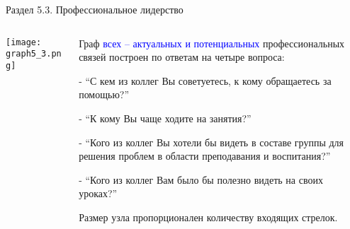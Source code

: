 \begin{frame}{Раздел 5.3. Профессиональное лидерство}


\begin{columns}
\begin{column}{0.75\textwidth} 
\centering
          \texttt{[image: graph5\_3.png]}
\end{column}
\begin{column}{0.25\textwidth} %

\tiny
Граф \textcolor{blue}{всех -- актуальных и потенциальных} профессиональных связей построен по ответам на четыре вопроса:
\smallskip

- ``С кем из коллег Вы советуетесь, к кому обращаетесь за помощью?''
\smallskip

- ``К кому Вы чаще ходите на занятия?''
\smallskip

- ``Кого из коллег Вы хотели бы видеть в составе группы для решения проблем в области преподавания и воспитания?''
\smallskip

- ``Кого из коллег Вам было бы полезно видеть на своих уроках?''
\smallskip

Размер узла пропорционален количеству входящих стрелок.
\end{column}
\end{columns}
\end{frame}



